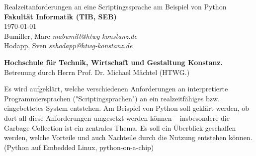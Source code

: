 \begin{titlepage}
	\vspace*{7cm}
	\begin{center}
		\Huge
		Realzeitanforderungen an eine Scriptingssprache am Beispiel von Python\\
		\vspace{1cm}
		\large
		\textbf{Fakultät Informatik (TIB, SEB)}\\
		\today\\
		\vspace{2cm}
		Bumiller, Marc \emph{mabumill@htwg-konstanz.de}\\
		Hodapp, Sven \emph{svhodapp@htwg-konstanz.de}\\
	\end{center}
	\normalsize
	\vfill
	\textbf{Hochschule für Technik, Wirtschaft und Gestaltung Konstanz.} Betreuung durch Herrn Prof. Dr. Michael Mächtel (HTWG.) 

Es wird aufgeklärt, welche verschiedenen Anforderungen an interpretierte Programmiersprachen ("Scriptingsprachen") an ein realzeitfähiges bzw. eingebettetes System entstehen. Am Beispiel von Python soll geklärt werden, ob dort all diese Anforderungen umgesetzt werden können -- insbesondere die Garbage Collection ist ein zentrales Thema. Es soll ein Überblick geschaffen werden, welche Vorteile und auch Nachteile durch die Nutzung entstehen können. (Python auf Embedded Linux, python-on-a-chip)

\end{titlepage}
